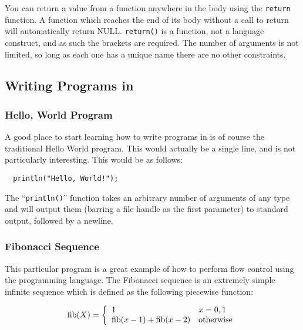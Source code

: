 You can return a value from a function anywhere in the body using the {\tt return}
function. A function which reaches the end of its body without a call to return will
automatically return NULL. {\tt return()} is a function, not a language construct, 
and as such the brackets are required. The number of arguments is not limited, 
so long as each one has a unique name there are no other constraints.


\subsection{Writing Programs in \ModLang}

\subsubsection{Hello, World Program}

A good place to start learning how to write programs in \ModLang is of course
the traditional Hello World program. This would actually be a single line,
and is not particularly interesting. This would be as follows:

\lstset{language=C++}
\begin{lstlisting}  
  println("Hello, World!"); 
\end{lstlisting}

The ``{\tt println()}'' function takes an arbitrary number of arguments of any
type and will output them (barring a file handle as the first parameter) to 
standard output, followed by a newline.

\subsubsection{Fibonacci Sequence}

This particular program is a great example of how to perform flow control
using the \ModLang programming language. The Fibonacci sequence is an extremely
simple infinite sequence which is defined as the following piecewise function:

\begin{equation}
  \mathrm{fib}(X) =  \left\{ \begin{array}{l l} 1 & x = 0, 1 \\ \mathrm{fib}(x-1) + 
      \mathrm{fib}(x-2) & \mathrm{otherwise} \end{array} \right.
\end{equation}

